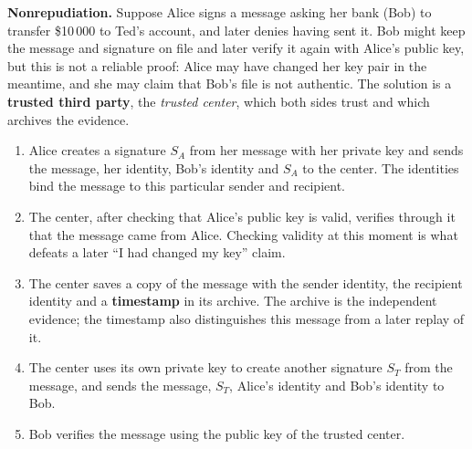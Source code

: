 \textbf{Nonrepudiation.} Suppose Alice signs a message asking her bank (Bob) to transfer \$10\,000 to Ted's account, and later denies having sent it. Bob might keep the message and signature on file and later verify it again with Alice's public key, but this is not a reliable proof: Alice may have changed her key pair in the meantime, and she may claim that Bob's file is not authentic. The solution is a \textbf{trusted third party}, the \emph{trusted center}, which both sides trust and which archives the evidence.
\begin{center}
\end{center}
\begin{enumerate}[leftmargin=1.6em]
  \item Alice creates a signature $S_A$ from her message with her private key and sends the message, her identity, Bob's identity and $S_A$ to the center. The identities bind the message to this particular sender and recipient.
  \item The center, after checking that Alice's public key is valid, verifies through it that the message came from Alice. Checking validity at this moment is what defeats a later ``I had changed my key'' claim.
  \item The center saves a copy of the message with the sender identity, the recipient identity and a \textbf{timestamp} in its archive. The archive is the independent evidence; the timestamp also distinguishes this message from a later replay of it.
  \item The center uses its own private key to create another signature $S_T$ from the message, and sends the message, $S_T$, Alice's identity and Bob's identity to Bob.
  \item Bob verifies the message using the public key of the trusted center.
\end{enumerate}
